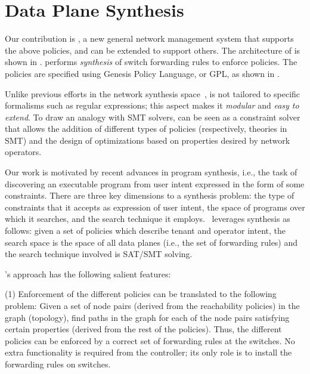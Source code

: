 \section{Data Plane Synthesis} \label{sec:synthesis} 

Our contribution is \name, a new general network management system
that supports the above policies, and can be extended
to support others. The architecture of \name is shown in
. \Name performs {\em synthesis} of switch
forwarding rules to enforce policies. The policies are
specified using Genesis Policy Language, or GPL, as shown in
.

Unlike previous efforts in the network synthesis
space~\cite{netgen,merlin}, \Name is not tailored to specific
formalisms such as regular expressions; this aspect makes it {\em
  modular} and {\em easy to extend}.
To draw an analogy with SMT solvers, \Name can be seen as a constraint
solver that allows the addition of different types of policies
(respectively, theories in SMT) and the design of
optimizations based on properties desired by network
  operators. 
  
  Our work is motivated by recent advances in program synthesis, i.e.,
  the task of discovering an executable program from user intent
  expressed in the form of some constraints. There are three key
  dimensions to a synthesis problem: the type of constraints that it
  accepts as expression of user intent, the space of programs over
  which it searches, and the search technique it employs.
  \Name\ leverages synthesis as follows: given a set of
  policies which describe tenant and operator intent, the
  search space is the space of all data planes (i.e., the set of
  forwarding rules) and the search technique involved is SAT/SMT
  solving.

\Name's approach has the following salient features:

(1) Enforcement of the different policies can be translated
to the following problem: Given a set of node pairs (derived from the
reachability policies) in the graph (topology), find paths in the
graph for each of the node pairs satisfying certain properties
(derived from the rest of the policies).  Thus, the
different policies can be enforced by a correct set of
forwarding rules at the switches.  No extra functionality is required
from the controller; its only role is to install the forwarding rules
on switches.

